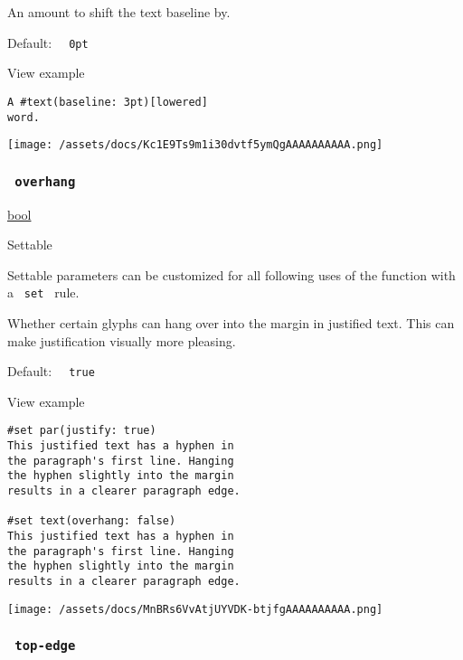 An amount to shift the text baseline by.

Default: \texttt{\ }{\texttt{\ 0pt\ }}\texttt{\ }


View example

\begin{verbatim}
A #text(baseline: 3pt)[lowered]
word.
\end{verbatim}

\texttt{[image: /assets/docs/Kc1E9Ts9m1i30dvtf5ymQgAAAAAAAAAA.png]}

\subsubsection{\texorpdfstring{\texttt{\ overhang\ }}{ overhang }}\label{parameters-overhang}

\href{/docs/reference/foundations/bool/}{bool}

{{ Settable }}

\label{parameters-overhang-settable-tooltip}
Settable parameters can be customized for all following uses of the
function with a \texttt{\ set\ } rule.

Whether certain glyphs can hang over into the margin in justified text.
This can make justification visually more pleasing.

Default: \texttt{\ }{\texttt{\ true\ }}\texttt{\ }


View example

\begin{verbatim}
#set par(justify: true)
This justified text has a hyphen in
the paragraph's first line. Hanging
the hyphen slightly into the margin
results in a clearer paragraph edge.

#set text(overhang: false)
This justified text has a hyphen in
the paragraph's first line. Hanging
the hyphen slightly into the margin
results in a clearer paragraph edge.
\end{verbatim}

\texttt{[image: /assets/docs/MnBRs6VvAtjUYVDK-btjfgAAAAAAAAAA.png]}

\subsubsection{\texorpdfstring{\texttt{\ top-edge\ }}{ top-edge }}\label{parameters-top-edge}

